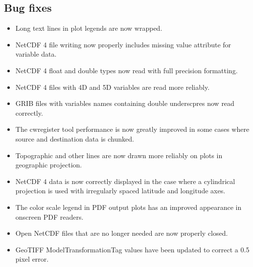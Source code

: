 \subsection*{ Bug fixes}
\begin{itemize}

  \item Long text lines in plot legends are now wrapped.

  \item NetCDF 4 file writing now properly includes missing value attribute
  for variable data.

  \item NetCDF 4 float and double types now read with full precision formatting.

  \item NetCDF 4 files with 4D and 5D variables are read more reliably.

  \item GRIB files with variables names containing double underscpres now read
  correctly.

  \item The cwregister tool performance is now greatly improved in some cases
  where source and destination data is chunked.

  \item Topographic and other lines are now drawn more reliably on plots in
  geographic projection.

  \item NetCDF 4 data is now correctly displayed in the case where a
  cylindrical projection is used with irregularly spaced latitude and longitude
  axes.

  \item The color scale legend in PDF output plots has an improved appearance
  in onscreen PDF readers.

  \item Open NetCDF files that are no longer needed are now properly closed.

  \item GeoTIFF ModelTransformationTag values have been updated to correct
  a 0.5 pixel error.

\end{itemize}




